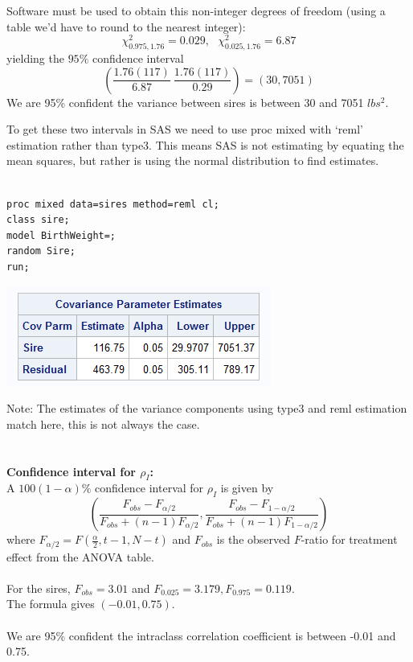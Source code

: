 Software must be used to obtain this non-integer degrees of freedom (using a table we'd have to round to the nearest integer):
$$ \chi^2_{0.975,1.76} = 0.029, \ \ \ \chi^2_{0.025,1.76} = 6.87 $$
yielding the $95\%$ confidence interval
$$ \left(\frac{1.76 (117)}{6.87} \ \frac{1.76 (117)}{0.29} \right)=(30,7051)$$
We are 95\% confident the variance between sires is between 30 and 7051 $lbs^2$.

\newpage
To get these two intervals in SAS we need to use proc mixed with `reml' estimation rather than type3.  This means SAS is not estimating by equating the mean squares, but rather is using the normal distribution to find estimates.\\~\\
\begin{small}
\begin{verbatim}
proc mixed data=sires method=reml cl;
class sire; 
model BirthWeight=; 
random Sire; 
run;
\end{verbatim}
\end{small}

\begin{center}
\includegraphics[scale=0.9]{Sire4}
\end{center}

Note:  The estimates of the variance components using type3 and reml estimation match here, this is not always the case.\\~\\~\\
\textbf{Confidence interval for $\rho_I$:}\\
A $100(1-\alpha)\%$ confidence interval for $\rho_I$ is given by
$$\left(\frac{F_{obs}-F_{\alpha/2}}{F_{obs}+(n-1)F_{\alpha/2}},\frac{F_{obs}-F_{1-\alpha/2}}{F_{obs}+(n-1)F_{1-\alpha/2}}\right) $$
where $F_{\alpha/2}=F(\frac{\alpha}{2},t-1,N-t)$ and $F_{obs}$ is the observed $F$-ratio for treatment effect from the ANOVA table.\\~\\
For the sires, $F_{obs}=3.01$ and $F_{0.025}=3.179, F_{0.975} = 0.119$.\\
The formula gives $(-0.01,0.75)$.  \\~\\
We are 95\% confident the intraclass correlation coefficient is between -0.01 and 0.75.

